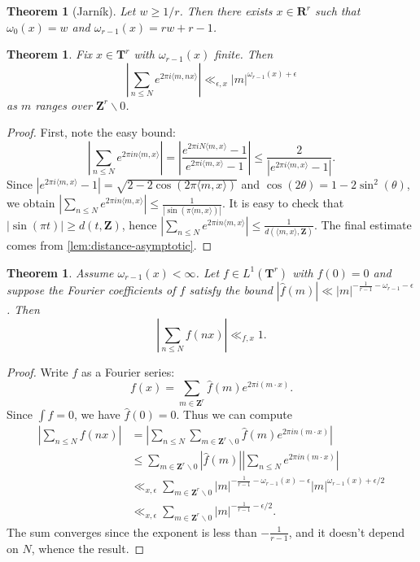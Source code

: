 \documentclass{article}
\newcommand{\bR}{\mathbf{R}}
\newcommand{\bT}{\mathbf{T}}
\newcommand{\bZ}{\mathbf{Z}}
\newtheorem{theorem}[subsection]{Theorem}
\theoremstyle{definition}
\begin{document}
\begin{theorem}[Jarník]\label{thm:existence-exponent}
Let $w\geqslant 1/r$. Then there exists $x\in \bR^r$ such that 
$\omega_0(x)=w$ and $\omega_{r-1}(x)=r w+r-1$. 
\end{theorem}

\begin{theorem}
Fix $x\in \bT^r$ with $\omega_{r-1}(x)$ finite. Then 
\[
	\left| \sum_{n\leqslant N} e^{2\pi i \langle m, nx\rangle}\right| \ll_{\epsilon,x} |m|^{\omega_{r-1}(x)+\epsilon} 
\]
as $m$ ranges over $\bZ^r\smallsetminus 0$. 
\end{theorem}
\begin{proof}
First, note the easy bound:
\[
	\left| \sum_{n\leqslant N} e^{2\pi in\langle m,x\rangle}\right|
		= \left|\frac{e^{2\pi i N \langle m,x\rangle}-1}{e^{2\pi i \langle m,x\rangle}-1}\right| 
		\leqslant \frac{2}{|e^{2\pi i \langle m,x\rangle}-1|} .
\]
Since $|e^{2\pi i \langle m,x\rangle}-1| = \sqrt{2-2\cos(2\pi \langle m,x\rangle)}$ and 
$\cos(2\theta)=1-2\sin^2(\theta)$, we obtain 
$\left|\sum_{n\leqslant N} e^{2\pi i n \langle m,x\rangle}\right| \leqslant \frac{1}{|\sin(\pi \langle m,x\rangle)|}$. 
It is easy to check that $|\sin(\pi t)|\geqslant d(t,\bZ)$, hence 
$\left|\sum_{n\leqslant N} e^{2\pi i n \langle m,x\rangle}\right| \leqslant \frac{1}{d(\langle m,x\rangle,\bZ)}$. 
The final estimate comes from \autoref{lem:distance-asymptotic}. 
\end{proof}

\begin{theorem}\label{thm:hard-sum-bound}
Assume $\omega_{r-1}(x)<\infty$. Let $f\in L^1(\bT^r)$ with 
$\widehat f(0)=0$ and suppose the Fourier coefficients of $f$ satisfy the bound 
$|\widehat f(m)| \ll |m|^{-\frac{1}{r-1}-\omega_{r-1}-\epsilon}$. Then 
\[
	\left|\sum_{n\leqslant N} f(n x)\right| \ll_{f,x} 1 .
\]
\end{theorem}
\begin{proof}
Write $f$ as a Fourier series:
\[
	f(x) = \sum_{m\in \bZ^r} \widehat f(m) e^{2\pi i (m\cdot x)} .
\]
Since $\int f=0$, we have $\widehat f(0)=0$. Thus we can compute 
\begin{align*}
	\left|\sum_{n\leqslant N} f(n x)\right| 
		&= \left| \sum_{n\leqslant N} \sum_{m\in \bZ^r\smallsetminus 0} \widehat f(m) e^{2\pi i n (m\cdot x)} \right| \\
		&\leqslant \sum_{m\in \bZ^r\smallsetminus 0} |\widehat f(m)| \left| \sum_{n\leqslant N} e^{2\pi i n (m\cdot x)}\right| \\
		&\ll_{x,\epsilon} \sum_{m\in \bZ^r\smallsetminus 0} |m|^{-\frac{1}{r-1}-\omega_{r-1}(x)-\epsilon} |m|^{\omega_{r-1}(x)+\epsilon/2} \\
		&\ll_{x,\epsilon} \sum_{m\in \bZ^r\smallsetminus 0} |m|^{-\frac{1}{r-1}-\epsilon/2}.
\end{align*}
The sum converges since the exponent is less than $-\frac{1}{r-1}$, and it 
doesn't depend on $N$, whence the result.
\end{proof}
\end{document}

